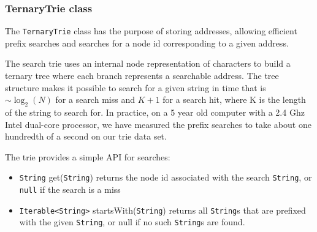 \subsubsection{TernaryTrie class}
\label{sec:TernaryTrie class}
The \texttt{TernaryTrie} class has the purpose of storing addresses, allowing efficient prefix searches and searches for a node id corresponding to a given address.

The search trie uses an internal node representation of characters to build a ternary tree where each branch represents a searchable address.
The tree structure makes it possible to search for a given string in time that is $\sim\log_2 (N)$ for a search miss and  $K+1$ for a search hit, where K is the length of the string to search for.
In practice, on a 5 year old computer with a 2.4 Ghz Intel dual-core processor, we have measured the prefix searches to take about one hundredth of a second on our trie data set.

The trie  provides a simple API for searches:
\begin{itemize}
	\item \texttt{String} get(\texttt{String}) returns the node id associated with the search \texttt{String}, or \texttt{null} if the search is a miss
	\item \texttt{Iterable<String>} startsWith(\texttt{String}) returns all \texttt{String}s that are prefixed with the given \texttt{String}, or null if no such \texttt{String}s are found.
\end{itemize}
